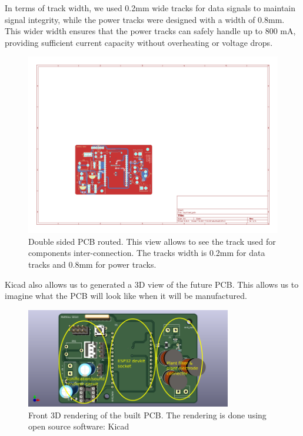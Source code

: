 In terms of track width, we used 0.2mm wide tracks for data signals to maintain signal integrity, while the power tracks were designed with a width of 0.8mm. This wider width ensures that the power tracks can safely handle up to 800 mA, providing sufficient current capacity without overheating or voltage drops.

\begin{figure}[H]
    \centering
    \includegraphics[width=\textwidth]{images/iop-routed_pcb.pdf}
    \caption{Double sided PCB routed. This view allows to see the track used for components inter-connection. The tracks width is 0.2mm for data tracks and 0.8mm for power tracks.}
    \vspace{0.1cm}
    \label{fig:iop_routed_pcb}
\end{figure}

Kicad also allows us to generated a 3D view of the future PCB. This allows us to imagine what the
PCB will look like when it will be manufactured.
\begin{figure}[H]
    \centering
    \includegraphics[width=0.8\textwidth]{images/front_iop_3D_view_modified.png}
    \caption{Front 3D rendering of the built PCB. The rendering is done using open source software: Kicad}
    \vspace{0.1cm}
    \label{fig:front_iop_3D_view_modified}
\end{figure}

